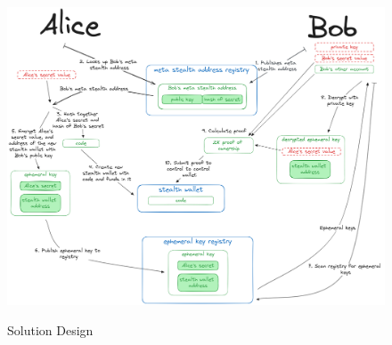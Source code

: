 \begin{figure}[h]
    \centering
    \includegraphics[width=\textwidth]{assets/images/high-level-flow.png}
    \caption{Solution Design}
	\cite{ButerinIncompleteGuide}
    \label{fig:solution}
    \vspace{0.5cm}
\end{figure}

